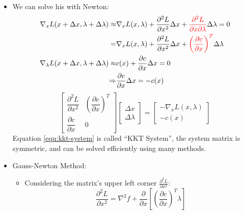 \begin{itemize}
\begin{equation}
\begin{aligned}
            \nabla_\lambda L(x,\lambda)=&c(x)=0
        \end{aligned}
    \end{equation}
    \item We can solve his with Newton:
    \begin{equation}
        \begin{aligned}
            \nabla_x L(x+\Delta x, \lambda + \Delta \lambda) \approx & \nabla_x L(x,\lambda)+\frac{\partial^2L}{\partial x^2}\Delta x + \textcolor{red}{\frac{\partial^2 L}{\partial x\partial \lambda}}\Delta\lambda = 0 \\
            =&\nabla_x L(x,\lambda)+\frac{\partial^2L}{\partial x^2}\Delta x + \textcolor{red}{\left(\frac{\partial c}{\partial x}\right)^T}\Delta\lambda \\
            \nabla_\lambda L(x+\Delta x, \lambda + \Delta \lambda) \approx & c(x) + \frac{\partial c}{\partial x}\Delta x = 0 \\
            \Rightarrow & \frac{\partial c}{\partial x}\Delta x=-c(x)
        \end{aligned}
    \end{equation}
    \begin{equation}
        \begin{bmatrix}
            \dfrac{\partial^2L}{\partial x^2} & \left(\dfrac{\partial c}{\partial x}\right)^T \\[3mm]
            \dfrac{\partial c}{\partial x} & 0
        \end{bmatrix}
        \begin{bmatrix}
            \Delta x \\
            \Delta \lambda
        \end{bmatrix}
        = 
        \begin{bmatrix}
            - \nabla_x L(x,\lambda) \\
            -c(x)
        \end{bmatrix}
        \label{equ:kkt-system}
    \end{equation}
    Equation \eqref{equ:kkt-system} is called ``KKT System'', the system matrix is symmetric, and can be solved efficiently using many methods.
    \item Gauss-Newton Method:
    \begin{itemize}
        \item Considering the matrix's upper left corner $\frac{\partial^2L}{\partial x^2}$:
        \begin{equation}
            \frac{\partial^2L}{\partial x^2}=\nabla^2f+\frac{\partial}{\partial x}\left[\left(\frac{\partial c}{\partial x}\right)^T\lambda\right]

\end{equation}
\end{itemize}
\end{itemize}
